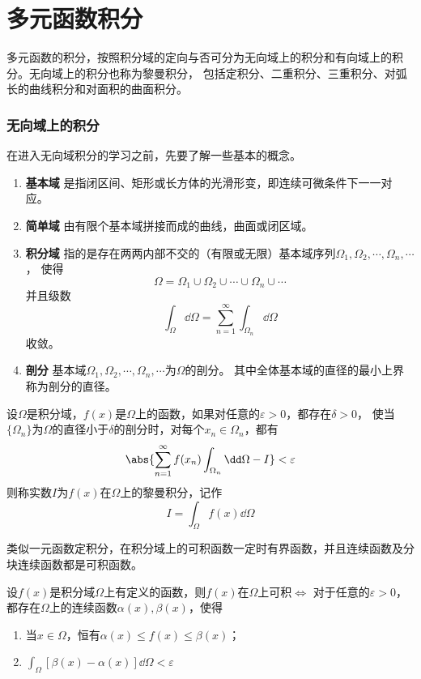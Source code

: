 \part{多元函数积分}
多元函数的积分，按照积分域的定向与否可分为无向域上的积分和有向域上的积分。无向域上的积分也称为黎曼积分，
包括定积分、二重积分、三重积分、对弧长的曲线积分和对面积的曲面积分。

\section{无向域上的积分}
在进入无向域积分的学习之前，先要了解一些基本的概念。
\begin{enumerate}
    \item \textbf{\textsf{基本域}} 是指闭区间、矩形或长方体的光滑形变，即连续可微条件下一一对应。
    \item \textbf{\textsf{简单域}} 由有限个基本域拼接而成的曲线，曲面或闭区域。
    \item \textbf{\textsf{积分域}} 指的是存在两两内部不交的（有限或无限）基本域序列$\Omega_1,\Omega_2,\cdots,\Omega_n,\cdots$，
          使得
          \[ \Omega = \Omega_1\cup\Omega_2\cup\cdots\cup\Omega_n\cup\cdots \]
          并且级数
          \[ \int_\Omega \dd\Omega = \sum_{n=1}^\infty \int_{\Omega_n} \dd\Omega \]
          收敛。
    \item \textbf{\textsf{剖分}} 基本域$\Omega_1,\Omega_2,\cdots,\Omega_n,\cdots$为$\Omega$的剖分。
          其中全体基本域的直径的最小上界称为剖分的直径。
\end{enumerate}

\begin{definition}
    设$\Omega$是积分域，$f(x)$是$\Omega$上的函数，如果对任意的$\varepsilon > 0$，都存在$\delta > 0$，
    使当$\{\Omega_n\}$为$\Omega$的直径小于$\delta$的剖分时，对每个$x_n\in\Omega_n$，都有
    \[ \abs{\sum_{n=1}^\infty f(x_n)\int_{\Omega_n} \dd\Omega - I} < \varepsilon \]
    则称实数$I$为$f(x)$在$\Omega$上的黎曼积分，记作
    \[ I = \int_\Omega f(x)\dd{\Omega} \]
\end{definition}

类似一元函数定积分，在积分域上的可积函数一定时有界函数，并且连续函数及分块连续函数都是可积函数。
\begin{theorem}
    设$f(x)$是积分域$\Omega$上有定义的函数，则$f(x)$在$\Omega$上可积$\iff$
    对于任意的$\varepsilon > 0$，都存在$\Omega$上的连续函数$\alpha(x),\beta(x)$，使得
    \begin{enumerate}[(1)]
        \item 当$x\in\Omega$，恒有$\alpha(x)\leq f(x) \leq \beta(x)$；
        \item $\displaystyle \int_\Omega [\beta(x)-\alpha(x)]\dd{\Omega} < \varepsilon$
    \end{enumerate}
\end{theorem}

